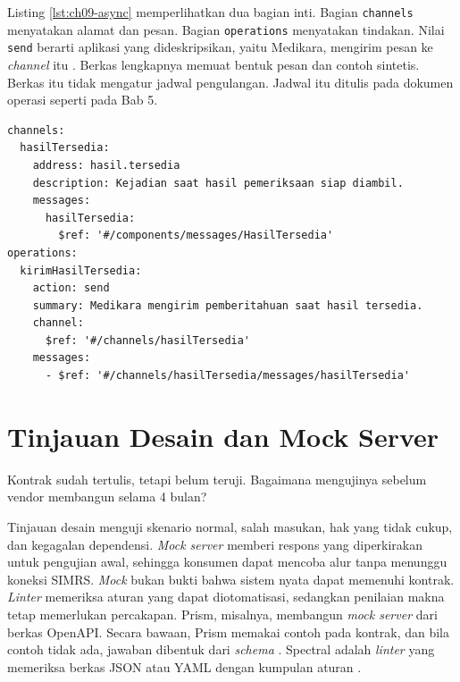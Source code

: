 \begin{pendalaman}[title={Pendalaman Teknis (opsional): Membaca Kontrak AsyncAPI}]
Listing \ref{lst:ch09-async} memperlihatkan dua bagian inti. Bagian \texttt{channels} menyatakan alamat dan pesan. Bagian \texttt{operations} menyatakan tindakan. Nilai \texttt{send} berarti aplikasi yang dideskripsikan, yaitu Medikara, mengirim pesan ke \textit{channel} itu \cite{asyncapi31}.
Berkas lengkapnya memuat bentuk pesan dan contoh sintetis. Berkas itu tidak mengatur jadwal pengulangan. Jadwal itu ditulis pada dokumen operasi seperti pada Bab 5.

\begin{lstlisting}[style=ch09yaml, caption={\textit{Channel} dan operasi, tersedia di \berkas{sources/chapter09/event-hasil-tersedia-asyncapi.yaml}}, label={lst:ch09-async}]
channels:
  hasilTersedia:
    address: hasil.tersedia
    description: Kejadian saat hasil pemeriksaan siap diambil.
    messages:
      hasilTersedia:
        $ref: '#/components/messages/HasilTersedia'
operations:
  kirimHasilTersedia:
    action: send
    summary: Medikara mengirim pemberitahuan saat hasil tersedia.
    channel:
      $ref: '#/channels/hasilTersedia'
    messages:
      - $ref: '#/channels/hasilTersedia/messages/hasilTersedia'
\end{lstlisting}
\end{pendalaman}

\section{Tinjauan Desain dan Mock Server}

Kontrak sudah tertulis, tetapi belum teruji. Bagaimana mengujinya sebelum vendor membangun selama 4 bulan?

Tinjauan desain menguji skenario normal, salah masukan, hak yang tidak cukup, dan kegagalan dependensi. \textit{Mock server} memberi respons yang diperkirakan untuk pengujian awal, sehingga konsumen dapat mencoba alur tanpa menunggu koneksi SIMRS. \textit{Mock} bukan bukti bahwa sistem nyata dapat
memenuhi kontrak. \textit{Linter} memeriksa aturan yang dapat diotomatisasi, sedangkan penilaian makna tetap memerlukan percakapan. Prism, misalnya, membangun \textit{mock server} dari berkas OpenAPI. Secara bawaan, Prism memakai contoh pada kontrak, dan bila contoh tidak ada, jawaban dibentuk dari \textit{schema} \cite{c09-prism}. Spectral adalah \textit{linter} yang memeriksa
berkas JSON atau YAML dengan kumpulan aturan \cite{spectral}.

